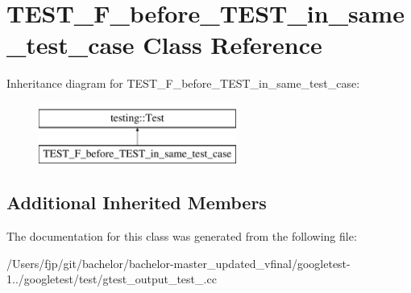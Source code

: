 \hypertarget{class_t_e_s_t___f__before___t_e_s_t__in__same__test__case}{}\section{T\+E\+S\+T\+\_\+\+F\+\_\+before\+\_\+\+T\+E\+S\+T\+\_\+in\+\_\+same\+\_\+test\+\_\+case Class Reference}
\label{class_t_e_s_t___f__before___t_e_s_t__in__same__test__case}
Inheritance diagram for T\+E\+S\+T\+\_\+\+F\+\_\+before\+\_\+\+T\+E\+S\+T\+\_\+in\+\_\+same\+\_\+test\+\_\+case\+:\begin{figure}[H]
\begin{center}
\leavevmode
\includegraphics[height=2.000000cm]{class_t_e_s_t___f__before___t_e_s_t__in__same__test__case}
\end{center}
\end{figure}
\subsection*{Additional Inherited Members}


The documentation for this class was generated from the following file\+:\begin{DoxyCompactItemize}
\item 
/\+Users/fjp/git/bachelor/bachelor-\/master\+\_\+updated\+\_\+vfinal/googletest-\/1../googletest/test/gtest\+\_\+output\+\_\+test\+\_\+.\+cc\end{DoxyCompactItemize}
